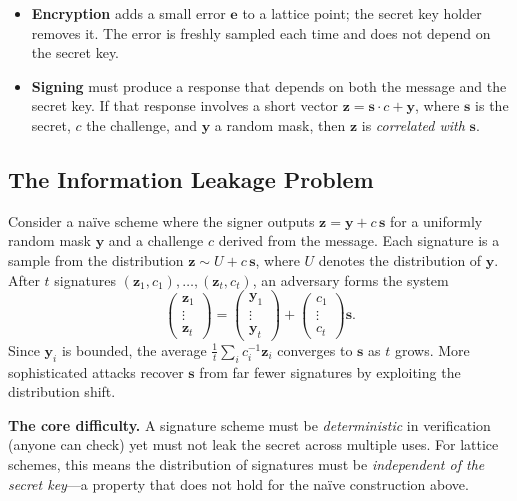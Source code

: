 \begin{itemize}
\item \textbf{Encryption} adds a small error $\mathbf{e}$ to a lattice point; the secret key holder removes it.  The error is freshly sampled each time and does not depend on the secret key.
\item \textbf{Signing} must produce a response that depends on both the message and the secret key.  If that response involves a short vector $\mathbf{z} = \mathbf{s} \cdot c + \mathbf{y}$, where $\mathbf{s}$ is the secret, $c$ the challenge, and $\mathbf{y}$ a random mask, then $\mathbf{z}$ is \emph{correlated with} $\mathbf{s}$.
\end{itemize}

\subsection{The Information Leakage Problem}
\label{subsec:info-leakage}

Consider a na\"ive scheme where the signer outputs $\mathbf{z} = \mathbf{y} + c\,\mathbf{s}$ for a uniformly random mask $\mathbf{y}$ and a challenge $c$ derived from the message.  Each signature is a sample from the distribution $\mathbf{z} \sim U + c\,\mathbf{s}$, where $U$ denotes the distribution of $\mathbf{y}$.  After $t$ signatures $(\mathbf{z}_1, c_1), \ldots, (\mathbf{z}_t, c_t)$, an adversary forms the system
\begin{equation}
\label{eq:naive-leak}
\begin{pmatrix} \mathbf{z}_1 \\ \vdots \\ \mathbf{z}_t \end{pmatrix}
=
\begin{pmatrix} \mathbf{y}_1 \\ \vdots \\ \mathbf{y}_t \end{pmatrix}
+
\begin{pmatrix} c_1 \\ \vdots \\ c_t \end{pmatrix}
\mathbf{s}.
\end{equation}
Since $\mathbf{y}_i$ is bounded, the average $\frac{1}{t}\sum_i c_i^{-1}\mathbf{z}_i$ converges to $\mathbf{s}$ as $t$ grows.  More sophisticated attacks recover $\mathbf{s}$ from far fewer signatures by exploiting the distribution shift.

\begin{svgraybox}
\textbf{The core difficulty.}  A signature scheme must be \emph{deterministic} in verification (anyone can check) yet must not leak the secret across multiple uses.  For lattice schemes, this means the distribution of signatures must be \emph{independent of the secret key}---a property that does not hold for the na\"ive construction above.
\end{svgraybox}

